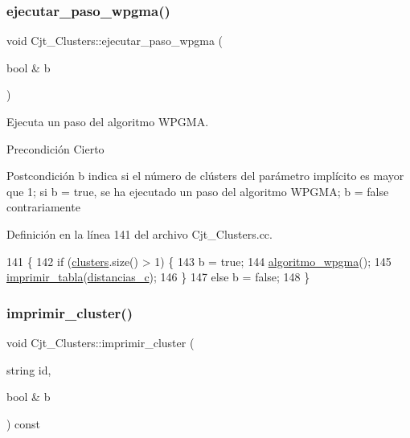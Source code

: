 \subsubsection{\texorpdfstring{ejecutar\+\_\+paso\+\_\+wpgma()}{ejecutar\_paso\_wpgma()}}
{\footnotesize\ttfamily void Cjt\+\_\+\+Clusters\+::ejecutar\+\_\+paso\+\_\+wpgma (\begin{DoxyParamCaption}\item[{bool \&}]{b }\end{DoxyParamCaption})}



Ejecuta un paso del algoritmo W\+P\+G\+MA. 

\begin{DoxyPrecond}{Precondición}
Cierto 
\end{DoxyPrecond}
\begin{DoxyPostcond}{Postcondición}
b indica si el número de clústers del parámetro implícito es mayor que 1; si b = true, se ha ejecutado un paso del algoritmo W\+P\+G\+MA; b = false contrariamente 
\end{DoxyPostcond}


Definición en la línea 141 del archivo Cjt\+\_\+\+Clusters.\+cc.


\begin{DoxyCode}
141                                               \{
142   \textcolor{keywordflow}{if} (\hyperlink{class_cjt___clusters_a866c5a14f8f50598be2af9fd8c115dd2}{clusters}.size() > 1) \{
143     b = \textcolor{keyword}{true};
144     \hyperlink{class_cjt___clusters_a04cfe3b7b8998398a48459f9a9339c22}{algoritmo\_wpgma}();
145     \hyperlink{_cjt___clusters_8cc_a5cec9117fc9081104f0adb60b07b64e5}{imprimir\_tabla}(\hyperlink{class_cjt___clusters_a2b912c7987fd370bdeaf5dabb966240f}{distancias\_c});
146   \}
147   \textcolor{keywordflow}{else} b = \textcolor{keyword}{false};
148 \}
\end{DoxyCode}
\mbox{\label{class_cjt___clusters_add140d48281573802396c267f0d15cee}} 
\subsubsection{\texorpdfstring{imprimir\+\_\+cluster()}{imprimir\_cluster()}}
{\footnotesize\ttfamily void Cjt\+\_\+\+Clusters\+::imprimir\+\_\+cluster (\begin{DoxyParamCaption}\item[{string}]{id,  }\item[{bool \&}]{b }\end{DoxyParamCaption}) const}




